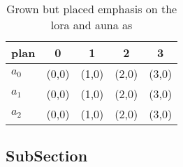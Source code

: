 \documentclass[a4paper]{article}
\begin{document}
\begin{table}
\begin{adjustbox}{width=0.6\columnwidth}
\begin{tabular}{|l|l|l|l|l|}
\hline
\textbf{plan} & \multicolumn{1}{c|}{\textbf{0}} & \multicolumn{1}{c|}{\textbf{1}} & \multicolumn{1}{c|}{\textbf{2}} & \multicolumn{1}{c|}{\textbf{3}} \\ \hline
\textbf{$a_0$}  & (0,0) & (1,0) & (2,0) & (3,0) \\ \hline
\textbf{$a_1$}  & (0,0) & (1,0) & (2,0) & (3,0) \\ \hline
\textbf{$a_2$}  & (0,0) & (1,0) & (2,0) & (3,0) \\ \hline
\end{tabular}
\end{adjustbox}
\caption{Grown but placed emphasis on the lora and auna as
}
\end{table}

\subsection{SubSection}
\end{document}

